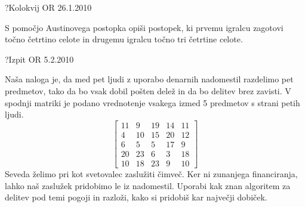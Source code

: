 
\begin{naloga}{?}{Kolokvij OR 26.1.2010}
\begin{vprasanje}
S pomočjo Austinovega postopka opiši postopek,
ki prvemu igralcu zagotovi točno četrtino celote
in drugemu igralcu točno tri četrtine celote.
\end{vprasanje}
\begin{odgovor}
\end{odgovor}
\end{naloga}


\begin{naloga}{?}{Izpit OR 5.2.2010}
\begin{vprasanje}
Naša naloga je,
da med pet ljudi z uporabo denarnih nadomestil razdelimo pet predmetov,
tako da bo vsak dobil pošten delež in da bo delitev brez zavisti.
V spodnji matriki je podano vrednotenje vsakega izmed 5 predmetov
s strani petih ljudi.
$$
\begin{bmatrix}
11 &  9 & 19 & 14 & 11 \\
 4 & 10 & 15 & 20 & 12 \\
 6 &  5 &  5 & 17 & 9  \\
20 & 23 &  6 &  3 & 18 \\
10 & 18 & 23 &  9 & 10
\end{bmatrix}
$$
Seveda želimo pri kot svetovalec zaslužiti čimveč.
Ker ni zunanjega financiranja, lahko naš zaslužek pridobimo le iz nadomestil.
Uporabi kak znan algoritem za delitev pod temi pogoji in razloži,
kako si pridobiš kar največji dobiček.
\end{vprasanje}
\begin{odgovor}
\end{odgovor}
\end{naloga}

